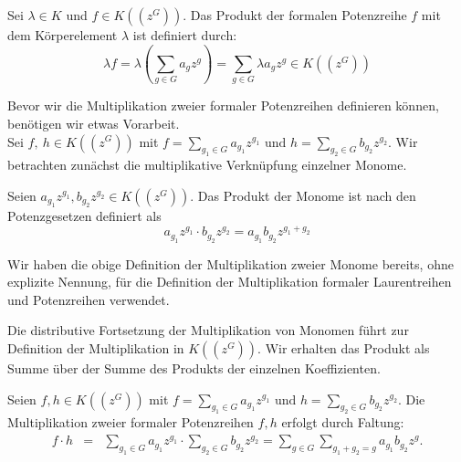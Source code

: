 %
%
%
\begin{defn}\label{MultiplikationMitKörperelement}
Sei $\lambda \in K$ und $f \in K\left(\left(z^{G}\right)\right)$. Das Produkt der formalen Potenzreihe $f$ mit dem Körperelement $\lambda$ ist definiert durch: \[\lambda f = \lambda \left(\sum_{g \in G}^{} a_g z^g\right) = \sum_{g \in G}^{} \lambda a_g z^g \in K\left(\left(z^{G}\right)\right)\]
\end{defn}
  
Bevor wir die Multiplikation zweier formaler Potenzreihen definieren können, benötigen wir etwas Vorarbeit.\\
Sei $f,~ h \in K\left(\left(z^{G}\right)\right)$ mit $ f = \sum_{g_1 \in G}^{} a_{g_1} z^{g_1} \text{ und } h = \sum_{g_2 \in G}^{} b_{g_2} z^{g_2} $. 
%
%
%
%
%
%
Wir betrachten zunächst die multiplikative Verknüpfung einzelner Monome. 
\begin{defn}
Seien $a_{g_1} z^{g_1}, b_{g_2} z^{g_2} \in K\left(\left(z^G\right)\right)$. Das Produkt der Monome ist nach den Potenzgesetzen definiert als 
\[a_{g_1} z^{g_1} \cdot b_{g_2}z^{g_2} = a_{g_1} b_{g_2} z^{g_1 + g_2}\]
\end{defn}
%
%
\begin{bem}
Wir haben die obige Definition der Multiplikation zweier Monome bereits, ohne explizite Nennung, für die Definition der Multiplikation formaler Laurentreihen und Potenzreihen verwendet. 
\end{bem}
%
%
%
%
%
%
%
Die distributive Fortsetzung der Multiplikation von Monomen führt zur Definition der Multiplikation in $K\left(\left(z^{G}\right)\right)$. Wir erhalten das Produkt als Summe über der Summe des Produkts der einzelnen Koeffizienten.
%
%
%
\begin{defn}\label{MultiplikationformalePotenzreihen}
Seien $f, h \in K\left(\left(z^G\right)\right)$ mit $f = \sum_{g_1 \in G}^{} a_{g_1} z^{g_1} \text{ und } h = \sum_{g_2 \in G}^{} b_{g_2} z^{g_2}$. Die Multiplikation zweier formaler Potenzreihen $f, h$ erfolgt durch Faltung: 
\begin{eqnarray*}\label{eq: multPotenzreihenkoerper}  
 f\cdot h &=& \sum_{g_1 \in G}^{} a_{g_1} z^{g_1} \cdot \sum_{g_2 \in G}^{} b_{g_2} z^{g_2} 
= \sum_{g \in G}^{}\sum_{g_1 + g_2 = g}^{}a_{g_1} b_{g_2}z^g.  
\end{eqnarray*} 
\end{defn}
